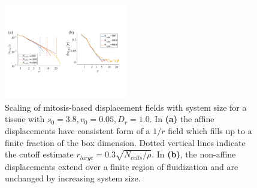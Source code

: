 \documentclass[
reprint
,aps
,amssymb
,amsmath
,superscriptaddress
]{revtex4-1}
\begin{document}
\begin{figure}[!t]  
\begin{center}
    \includegraphics[width=0.48\textwidth]{manuscript_images_app_single_events.pdf}
    \caption{\label{fig:app_single_events} Scaling of mitosis-based displacement fields with system size for a tissue with $s_0=3.8, v_0=0.05, D_r = 1.0$. In \textbf{(a)} the affine displacements have consistent form of a $1/r$ field which fills up to a finite fraction of the box dimension. Dotted vertical lines indicate the cutoff estimate $r_{large} = 0.3 \sqrt{N_{cells}/\rho}$. In \textbf{(b)}, the non-affine displacements extend over a finite region of fluidization and are unchanged by increasing system size.}
    \end{center}
\end{figure}


\end{document}
